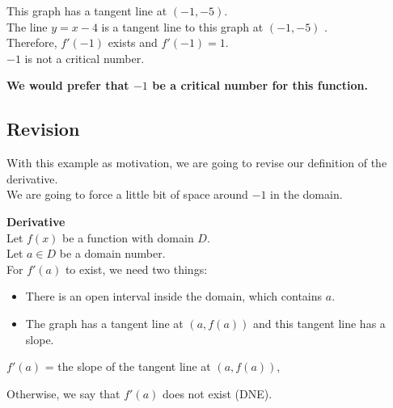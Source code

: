 \documentclass{ximera}
\begin{document}
This graph has a tangent line at $(-1,-5)$.  \\

The line $y = x - 4$ is a tangent line to this graph at $(-1,-5)$ . \\

Therefore, $f'(-1)$ exists and $f'(-1) = 1$.  \\

$-1$ is not a critical number. \\


\begin{center}
\textbf{\textcolor{red!80!black}{We would prefer that $-1$ be a critical number for this function.}}
\end{center}














\subsection*{Revision}


With this example as motivation, we are going to revise our definition of the derivative. \\


We are going to force a little bit of space around $-1$ in the domain. \\




\begin{definition} \textbf{\textcolor{green!50!black}{Derivative}}  \\

Let $f(x)$ be a function with domain $D$. \\
Let $a \in D$ be a domain number. \\



For $f'(a)$ to exist, we need two things:

\begin{itemize}
\item There is an open interval inside the domain, which contains $a$.
\item The graph has a tangent line at $(a, f(a))$ and this tangent line has a slope.
\end{itemize}



\begin{center}

$f'(a)$ = the slope of the tangent line at $(a, f(a))$,

\end{center}



Otherwise, we say that $f'(a)$ does not exist (DNE).






\end{definition}
\end{document}
